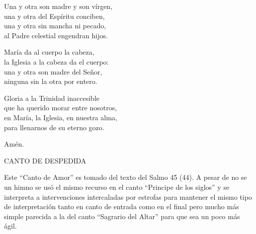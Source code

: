 \documentclass[12pt, letterpaper]{report}
\begin{document}
    \noindent
    Una y otra son madre y son v\'irgen,\\
    una y otra del Esp\'iritu conciben,\\
    una y otra sin mancha ni pecado,\\
    al Padre celestial engendran hijos.

    \noindent
    Mar\'ia da al cuerpo la cabeza,\\
    la Iglesia a la cabeza da el cuerpo:\\
    una y otra son madre del Se\~nor,\\
    ninguna sin la otra por entero.

    \noindent
    Gloria a la Trinidad inaccesible\\
    que ha querido morar entre nosotros,\\
    en Mar\'ia, la Iglesia, en nuestra alma,\\
    para llenarnos de su eterno gozo.

    \noindent
    Am\'en.
    \clearpage




    \begin{center}
      {\large CANTO DE DESPEDIDA}
    \end{center}

    Este ``Canto de Amor'' es tomado del texto del Salmo 45 (44). A pesar de no se un himno se us\'o el mismo recurso en el canto ``Principe de los siglos'' y se interpreta a intervenciones intercaladas por estrofas para mantener el mismo tipo de interpretaci\'on tanto en canto de entrada como en el final pero mucho m\'as simple parecida a la del canto ``Sagrario del Altar'' para que sea un poco m\'as \'agil.
\end{document}
